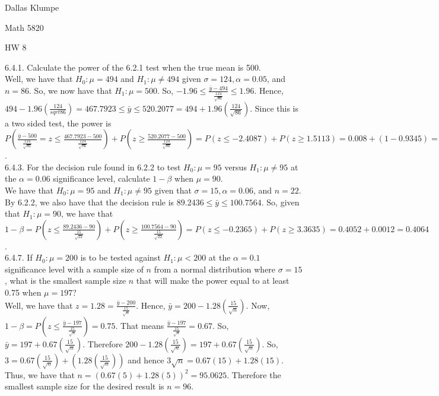 \documentclass[12pt]{article}
\begin{document}
\noindent Dallas Klumpe

\noindent Math 5820

\noindent HW 8

6.4.1. Calculate the power of the 6.2.1 test when the true mean is 500.\\
Well, we have that $H_0:\mu=494$ and $H_1:\mu\neq494$ given $\sigma=124, \alpha=0.05$, and $n=86$. So, we now have that $H_1:\mu=500$. So, $-1.96\leq\frac{\bar{y}-494}{\frac{124}{\sqrt{86}}}\leq1.96$. Hence, $494-1.96(\frac{124}{sqrt{86}})=467.7923\leq\bar{y}\leq520.2077=494+1.96(\frac{124}{\sqrt{86}})$. Since this is a two sided test, the power is $P(\frac{\bar{y}-500}{\frac{124}{\sqrt{86}}}=z\leq\frac{467.7923-500}{\frac{124}{\sqrt{86}}})+P(z\geq\frac{520.2077-500}{\frac{124}{\sqrt{86}}})=P(z\leq-2.4087)+P(z\geq1.5113)=0.008+(1-0.9345)=0.0735$.\\[20pt]

6.4.3. For the decision rule found in 6.2.2 to test $H_0:\mu=95$ versus $H_1:\mu\neq95$ at the $\alpha=0.06$ significance level, calculate $1-\beta$ when $\mu=90$.\\
We have that $H_0:\mu=95$ and $H_1:\mu\neq95$ given that $\sigma=15, \alpha=0.06$, and $n=22$. By 6.2.2, we also have that the decision rule is $89.2436\leq\bar{y}\leq100.7564$. So, given that $H_1:\mu=90$, we have that $1-\beta=P(z\leq\frac{89.2436-90}{\frac{15}{\sqrt{22}}})+P(z\geq\frac{100.7564-90}{\frac{15}{\sqrt{22}}})=P(z\leq-0.2365)+P(z\geq3.3635)=0.4052+0.0012=0.4064$.\\[20pt]

6.4.7. If $H_0:\mu=200$ is to be tested against $H_1:\mu<200$ at the $\alpha=0.1$ significance level with a sample size of $n$ from a normal distribution where $\sigma=15$, what is the smallest sample size $n$ that will make the power equal to at least 0.75 when $\mu=197$?\\
Well, we have that $z=1.28=\frac{\bar{y}-200}{\frac{15}{\sqrt{n}}}$. Hence, $\bar{y}=200-1.28(\frac{15}{\sqrt{n}})$. Now, $1-\beta=P(z\leq\frac{\bar{y}-197}{\frac{15}{\sqrt{n}}})=0.75$. That means $\frac{\bar{y}-197}{\frac{15}{\sqrt{n}}}=0.67$. So, $\bar{y}=197+0.67(\frac{15}{\sqrt{n}})$. Therefore $200-1.28(\frac{15}{\sqrt{n}})=197+0.67(\frac{15}{\sqrt{n}})$. So, $3=0.67(\frac{15}{\sqrt{n}})+(1.28(\frac{15}{\sqrt{n}}))$ and hence $3\sqrt{n}=0.67(15)+1.28(15)$. Thus, we have that $n=(0.67(5)+1.28(5))^2=95.0625$. Therefore the smallest sample size for the desired result is $n=96$.
\end{document}
